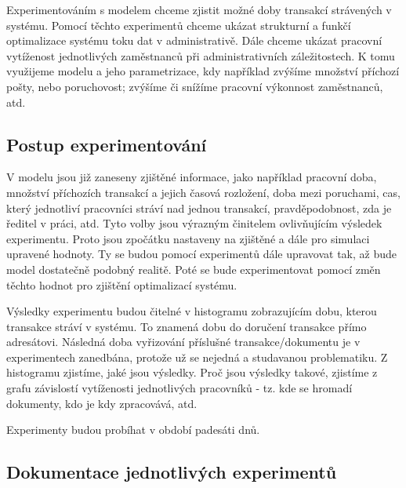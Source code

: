 \documentclass[12pt,a4paper]{article}
\begin{document}
Experimentováním s modelem chceme zjistit možné doby transakcí strávených v systému. Pomocí těchto experimentů chceme ukázat strukturní a funkčí optimalizace systému toku dat v administrativě. Dále chceme ukázat pracovní vytíženost jednotlivých zaměstnanců při administrativních záležitostech. K tomu využijeme modelu a jeho parametrizace, kdy například zvýšíme množství příchozí pošty, nebo poruchovost; zvýšíme či snížíme pracovní výkonnost zaměstnanců, atd.

\subsection{Postup experimentování}
V modelu jsou již zaneseny zjištěné informace, jako například pracovní doba, množství příchozích transakcí a jejich časová rozložení, doba mezi poruchami, cas, který jednotliví pracovníci stráví nad jednou transakcí, pravděpodobnost, zda je ředitel v práci, atd. Tyto volby jsou výrazným činitelem ovlivňujícím výsledek experimentu. Proto jsou zpočátku nastaveny na zjištěné a dále pro simulaci upravené hodnoty. Ty se budou pomocí experimentů dále upravovat tak, až bude model dostatečně podobný realitě. Poté se bude experimentovat pomocí změn těchto hodnot pro zjištění optimalizací systému.

Výsledky experimentu budou čitelné v histogramu zobrazujícím dobu, kterou transakce stráví v systému. To znamená dobu do doručení transakce přímo adresátovi. Následná doba vyřizování příslušné transakce/dokumentu je v experimentech zanedbána, protože už se nejedná a studavanou problematiku. Z histogramu zjistíme, jaké jsou výsledky. Proč jsou výsledky takové, zjistíme z grafu závislostí vytíženosti jednotlivých pracovníků - tz. kde se hromadí dokumenty, kdo je kdy zpracovává, atd. 

%
%
%
%

Experimenty budou probíhat v období padesáti dnů.

\subsection{Dokumentace jednotlivých experimentů}
\end{document}
